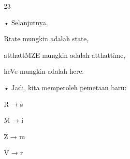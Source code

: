 \documentclass{article}
\begin{document}

23

• Selanjutnya, 


Rtate mungkin adalah state, 


atthattMZE mungkin adalah atthattime, 


heVe mungkin adalah here. 

• Jadi, kita memperoleh pemetaan baru:


 R → s


 M → i


 Z → m


 V → r
\end{document}
